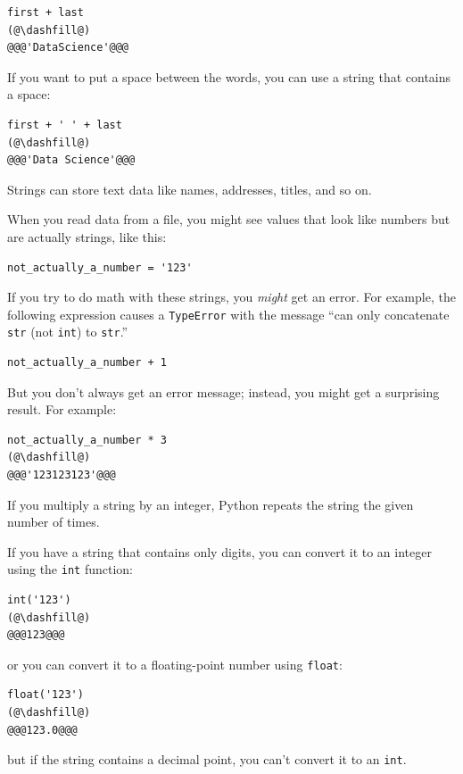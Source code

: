 \begin{lstlisting}[]
first + last
(@\dashfill@)
@@@'DataScience'@@@
\end{lstlisting}

If you want to put a space between the words, you can use a string that
contains a space:

\begin{lstlisting}[]
first + ' ' + last
(@\dashfill@)
@@@'Data Science'@@@
\end{lstlisting}

Strings can store text data like names, addresses, titles, and so on.

When you read data from a file, you might see values that look like
numbers but are actually strings, like this:

\begin{lstlisting}[]
not_actually_a_number = '123'
\end{lstlisting}

If you try to do math with these strings, you \emph{might} get an error.
For example, the following expression causes a
\passthrough{\lstinline!TypeError!} with the message ``can only
concatenate \passthrough{\lstinline!str!} (not
\passthrough{\lstinline!int!}) to \passthrough{\lstinline!str!}.''

\begin{lstlisting}
not_actually_a_number + 1
\end{lstlisting}

But you don't always get an error message; instead, you might get a
surprising result. For example:

\begin{lstlisting}[]
not_actually_a_number * 3
(@\dashfill@)
@@@'123123123'@@@
\end{lstlisting}

If you multiply a string by an integer, Python repeats the string the
given number of times.

If you have a string that contains only digits, you can convert it to an
integer using the \passthrough{\lstinline!int!} function:

\begin{lstlisting}[]
int('123')
(@\dashfill@)
@@@123@@@
\end{lstlisting}
or you can convert it to a floating-point number using
\passthrough{\lstinline!float!}:

\begin{lstlisting}[]
float('123')
(@\dashfill@)
@@@123.0@@@
\end{lstlisting}
but if the string contains a decimal point, you can't convert it to an
\passthrough{\lstinline!int!}.

